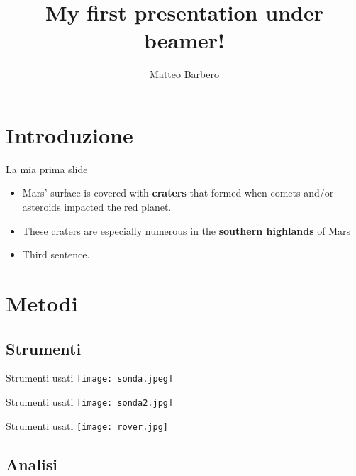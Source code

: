 \documentclass{beamer}
\title{My first presentation under beamer!}
\author{Matteo Barbero}
\institute{Alma Mater Studiorum - University of Bologna\\}
\begin{document}
\maketitle


\section{Introduzione}

\begin{frame}{La mia prima slide}
\begin{itemize}
    \item  Mars' surface is covered with \textbf{craters} that formed when comets and/or asteroids impacted the red planet. 
    \item \pause These craters are especially numerous in the \textbf{southern highlands} of Mars
    \item \pause Third sentence.
\end{itemize}
\end{frame}

\section{Metodi}

\subsection{Strumenti}

\begin{frame}{Strumenti usati}
 \texttt{[image: sonda.jpeg]}
 \centering
\end{frame}

\begin{frame}{Strumenti usati}
 \texttt{[image: sonda2.jpg]}
 \centering
\end{frame}

\begin{frame}{Strumenti usati}
 \texttt{[image: rover.jpg]}
 \centering
\end{frame}

\subsection{Analisi}
\end{document}
